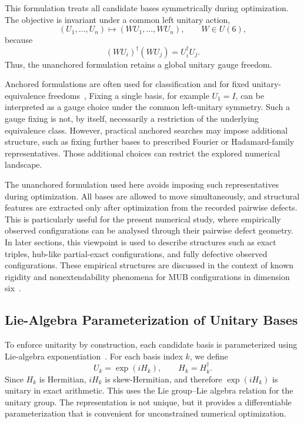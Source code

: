 \documentclass[a4paper,twocolumn,11pt,amsfonts,amssymb]{quantumarticle}
\begin{document}
This formulation treats all candidate bases symmetrically during optimization. The objective is invariant under a common left unitary action,
\[
(U_1,\ldots,U_n) \mapsto (WU_1,\ldots,WU_n), \qquad W \in U(6),
\]
because
\[
(WU_i)^\dagger(WU_j)=U_i^\dagger U_j.
\]
Thus, the unanchored formulation retains a global unitary gauge freedom.


Anchored formulations are often used for classification and for fixed unitary-equivalence freedoms~\cite{durt2010OnMutuallyUnbiasedBases,brierley2009MutuallyUnbiasedBases}, Fixing a single basis, for example \(U_1=I\), can be interpreted as a gauge choice under the common left-unitary symmetry. Such a gauge fixing is not, by itself, necessarily a restriction of the underlying equivalence class. However, practical anchored searches may impose additional structure, such as fixing further bases to prescribed Fourier or Hadamard-family representatives. Those additional choices can restrict the explored numerical landscape.

The unanchored formulation used here avoids imposing such representatives during optimization. All bases are allowed to move simultaneously, and structural features are extracted only after optimization from the recorded pairwise defects. This is particularly useful for the present numerical study, where empirically observed configurations can be analysed through their pairwise defect geometry. In later sections, this viewpoint is used to describe structures such as exact triples, hub-like partial-exact configurations, and fully defective observed configurations. These empirical structures are discussed in the context of known rigidity and nonextendability phenomena for MUB configurations in dimension six~\cite{Grassl2009OnSICPOVMsMUBsd6}.

\subsection{Lie-Algebra Parameterization of Unitary Bases}

To enforce unitarity by construction, each candidate basis is parameterized using Lie-algebra exponentiation~\cite{elena2000ApproxLieAlgerba}. For each basis index $k$, we define
\begin{equation}
    U_k = \exp(iH_k),
    \qquad
    H_k = H_k^\dagger .
    \label{eq:lie-exp-param}
\end{equation}
Since $H_k$ is Hermitian, $iH_k$ is skew-Hermitian, and therefore $\exp(iH_k)$ is unitary in exact arithmetic. This uses the Lie group--Lie algebra relation for the unitary group. The representation is not unique, but it provides a differentiable parameterization that is convenient for unconstrained numerical optimization.
\end{document}
